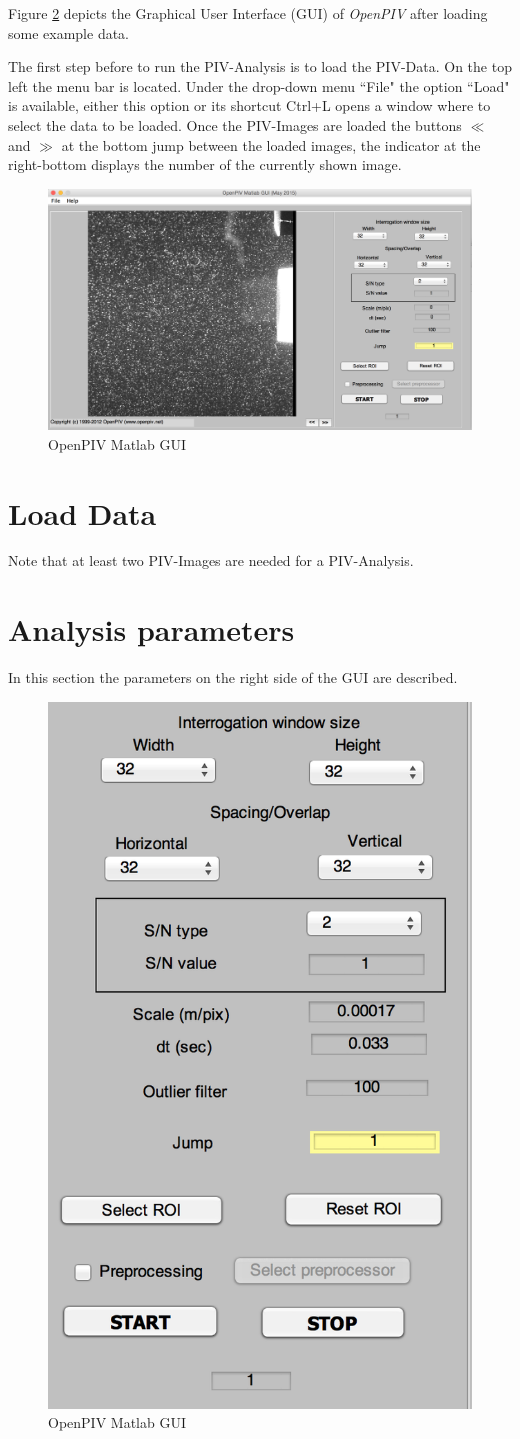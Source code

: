 Figure \ref{fig:GUI} depicts the Graphical User Interface (GUI) of \emph{OpenPIV} after loading 
some example data.

The first step before to run the PIV-Analysis is to load the PIV-Data. On the top left the menu bar  is located. Under the drop-down menu ``File" the option ``Load" is available, either this option or  its shortcut Ctrl+L opens a window where to select the data to be loaded. Once the PIV-Images are  loaded the buttons $\ll$ and $\gg$ at the bottom jump between the loaded images, the indicator at  the right-bottom displays the number of the currently shown image. 


\begin{figure}[H]
	\centering
	\includegraphics[width=\textwidth]{Images/User_Interface.png}
	\caption{OpenPIV Matlab GUI}
	\label{fig:GUI}
\end{figure}

\section{Load Data}\label{Load}

Note that at least two PIV-Images are needed for a PIV-Analysis. 

\section{Analysis parameters}\label{parameters}
In this section the parameters on the right side of the GUI are described.

\begin{figure}[H]
	\centering
	\includegraphics[width=.35\textwidth]{Images/parameters.png}
	\caption{OpenPIV Matlab GUI}
	\label{fig:GUI}
\end{figure}

